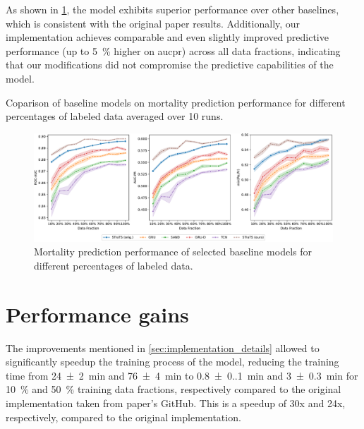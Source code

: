 As shown in \cref{fig:baseline_results}, the  model exhibits superior performance over other baselines, which is consistent with the original paper results. Additionally, our implementation achieves comparable and even slightly improved predictive performance (up to \qty{5}{\percent} higher on \gls{aucpr}) across all data fractions, indicating that our modifications did not compromise the predictive capabilities of the model.


\begin{table}

\caption{Coparison of baseline models on mortality prediction performance for different percentages of labeled data averaged over 10 runs.}
\label{tab:baseline_experiments}
\end{table}


\begin{figure}
    \centering
    \includegraphics[width=\textwidth]{./figures/baseline_results}
    \caption{Mortality prediction performance of selected baseline models for different percentages of labeled data.}
    \label{fig:baseline_results}
\end{figure}


\section{Performance gains}

\label{sec:performance_gains}

The improvements mentioned in \cref{sec:implementation_details} allowed to significantly speedup the training process of the model, reducing the training time from \qty{24(2)}{\minute} and \qty{76(4)}{\minute} to \qty{0.8(0.1)}{\minute} and \qty{3(0.3)}{\minute} for \qty{10}{\percent} and \qty{50}{\percent} training data fractions, respectively compared to the original implementation taken from paper's GitHub. This is a speedup of \num{30}x and \num{24}x, respectively, compared to the original implementation.



